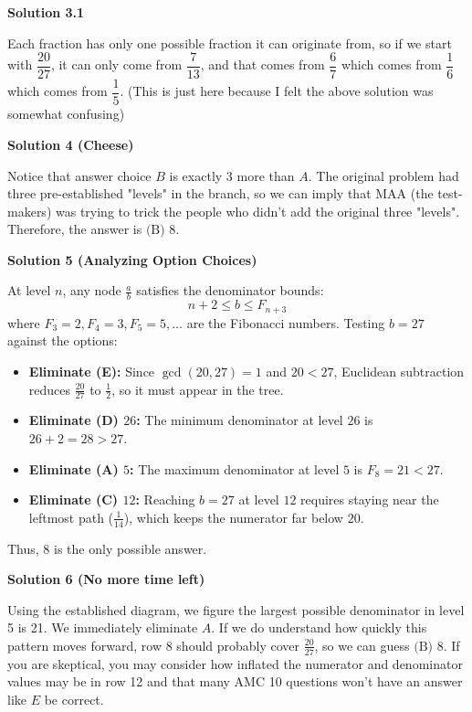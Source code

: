 \begin{enumerate}
 



\textbf{Solution 3.1}

Each fraction has only one possible fraction it can originate from, so if we start with $\dfrac{20}{27}$, it can only come from $\dfrac{7}{13}$, and that comes from $\dfrac{6}{7}$ which comes from $\dfrac{1}{6}$ which comes from $\dfrac{1}{5}$. (This is just here because I felt the above solution was somewhat confusing)

 



\textbf{Solution 4 (Cheese)}

Notice that answer choice $B$ is exactly 3 more than $A$. The original problem had three pre-established "levels" in the branch, so we can imply that MAA (the test-makers) was trying to trick the people who didn't add the original three "levels". Therefore, the answer is $\boxed{\text{(B) 8}}$.

 



\textbf{Solution 5 (Analyzing Option Choices)}

At level $n$, any node $\frac{a}{b}$ satisfies the denominator bounds:
 \[n + 2 \leq b \leq F_{n+3}\]where $F_3 = 2, F_4 = 3, F_5 = 5, \dots$ are the Fibonacci numbers. Testing $b = 27$ against the options:

 
            \begin{itemize}
        \item \textbf{Eliminate (E):} Since $\gcd(20, 27) = 1$ and $20 < 27$, Euclidean subtraction reduces $\frac{20}{27}$ to $\frac{1}{2}$, so it must appear in the tree.
        \item \textbf{Eliminate (D) $26$:} The minimum denominator at level $26$ is $26 + 2 = 28 > 27$.
        \item \textbf{Eliminate (A) $5$:} The maximum denominator at level $5$ is $F_8 = 21 < 27$.
        \item \textbf{Eliminate (C) $12$:} Reaching $b = 27$ at level $12$ requires staying near the leftmost path ($\frac{1}{14}$), which keeps the numerator far below $20$.
            \end{itemize}
            Thus, $\boxed{8}$ is the only possible answer.

 



\textbf{Solution 6 (No more time left)}

Using the established diagram, we figure the largest possible denominator in level 5 is 21. We immediately eliminate $A$. If we do understand how quickly this pattern moves forward, row 8 should probably cover $\frac{20}{27}$, so we can guess $\boxed{\text{(B) 8}}$. If you are skeptical, you may consider how inflated the numerator and denominator values may be in row 12 and that many AMC 10 questions won't have an answer like $E$ be correct.


\end{enumerate}

